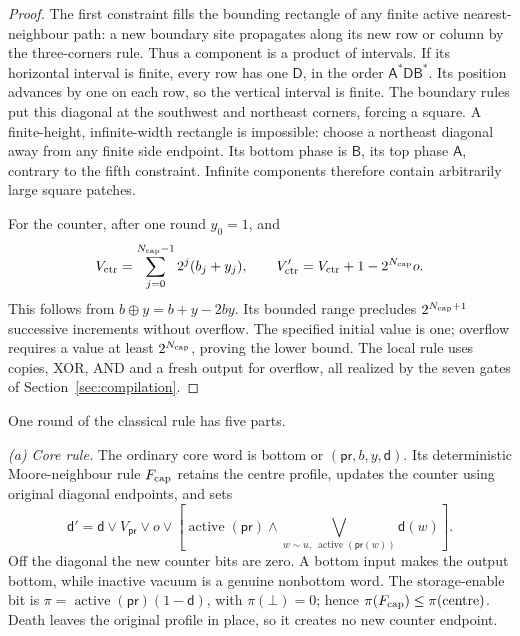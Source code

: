 \begin{proof}
The first constraint fills the bounding rectangle of any finite active
nearest-neighbour path: a new boundary site propagates along its new
row or column by the three-corners rule. Thus a component is a product
of intervals. If its horizontal interval is finite, every row has one
\(\mathsf D\), in the order \(\mathsf A^*\mathsf D\mathsf B^*\). Its position advances
by one on each row, so the vertical interval is finite. The boundary
rules put this diagonal at the southwest and northeast corners, forcing
a square. A finite-height, infinite-width rectangle is impossible:
choose a northeast diagonal away from any finite side endpoint. Its
bottom phase is \(\mathsf B\), its top phase \(\mathsf A\), contrary to
the fifth constraint. Infinite components therefore contain arbitrarily
large square patches.

For the counter, after one round \(y_0=1\), and
\[
 V_{\rm ctr}=\sum_{j=0}^{N_{\rm cap}-1}2^j(b_j+y_j),\qquad
 V'_{\rm ctr}=V_{\rm ctr}+1-2^{N_{\rm cap}}o.
\]
This follows from \(b\oplus y=b+y-2by\). Its bounded range precludes
\(2^{N_{\rm cap}+1}\) successive increments without overflow.
The specified initial value is one; overflow requires a value at least
\(2^{N_{\rm cap}}\), proving the lower bound. The local rule uses
copies, XOR, AND and a fresh output for overflow, all realized by the
seven gates of Section~\ref{sec:compilation}.
\end{proof}

One round of the classical rule has five parts.

\emph{(a) Core rule.} The ordinary core word is bottom or \((\mathsf{pr},b,y,\mathsf d)\). Its deterministic Moore-neighbour rule \(F_{\rm cap}\) retains the centre profile, updates the counter using original diagonal endpoints, and sets
\[
 \mathsf d'=\mathsf d\lor V_{\mathsf{pr}}\lor o\lor
 \left[\operatorname{active}(\mathsf{pr})\land
 \bigvee_{w\sim u,\ \operatorname{active}(\mathsf{pr}(w))}\mathsf d(w)\right].
\]
Off the diagonal the new counter bits are zero. A bottom input makes the output bottom, while inactive vacuum is a genuine nonbottom word. The storage-enable bit is \(\pi=\operatorname{active}(\mathsf{pr})(1-\mathsf d)\), with \(\pi(\bot)=0\); hence \(\pi(F_{\rm cap})\le\pi(\text{centre})\). Death leaves the original profile in place, so it creates no new counter endpoint.

